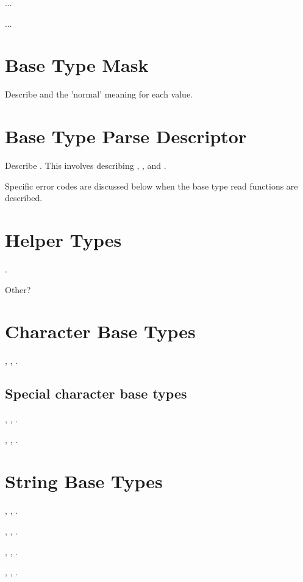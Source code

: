  ... 

 ... 

\section{Base Type Mask}
\label{sec:base-type-mask}

Describe \PDCbasem{} and the 'normal' meaning for each value.

\section{Base Type Parse Descriptor}
\label{sec:base-type-parse-descriptors}

Describe \PDCbasepd{}.  This involves describing \PDCloct{}, \PDCpost{},
and \PDCerrCodet{}.  

Specific error codes are discussed below
when the base type read functions are described.

\section{Helper Types}

\PDCregexpt{}.

Other?

\section{Character Base Types}
, , .

\subsection{Special character base types}

, , .

, , .

\section{String Base Types}

, , .

, , .

, , .

, , .

